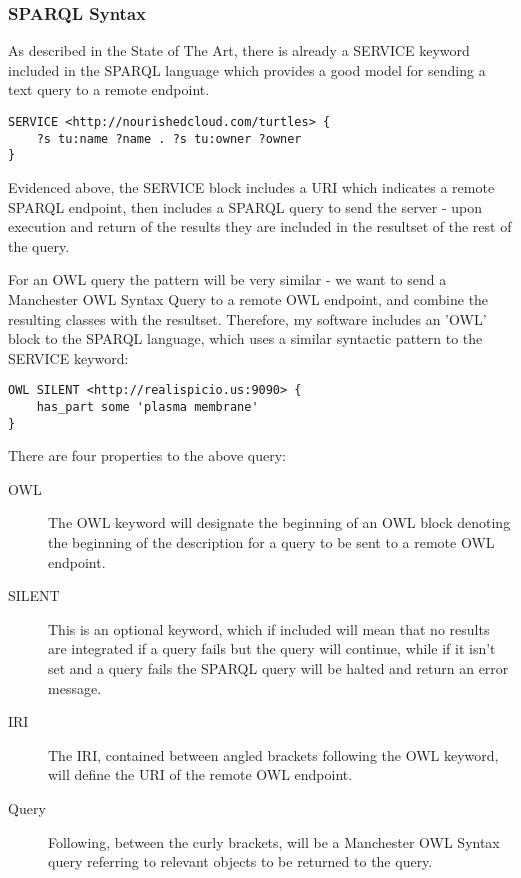 \documentclass{article}
\begin{document}
\subsubsection{SPARQL Syntax}

As described in the State of The Art, there is already a SERVICE keyword
included in the SPARQL language which provides a good model for sending a text
query to a remote endpoint. 

\begin{lstlisting}
SERVICE <http://nourishedcloud.com/turtles> { 
    ?s tu:name ?name . ?s tu:owner ?owner
}
\end{lstlisting}

Evidenced above, the SERVICE block includes a URI which indicates a remote
SPARQL endpoint, then includes a SPARQL query to send the server - upon
execution and return of the results they are included in the resultset of the
rest of the query.

For an OWL query the pattern will be very similar - we want to send a Manchester
OWL Syntax Query to a remote OWL endpoint, and combine the resulting classes
with the resultset. Therefore, my software includes an 'OWL' block to the SPARQL 
language, which uses a similar syntactic pattern to the SERVICE keyword:

\begin{lstlisting}
OWL SILENT <http://realispicio.us:9090> {
    has_part some 'plasma membrane'
}
\end{lstlisting}

There are four properties to the above query:

\begin{description}
    \item[OWL] The OWL keyword will designate the beginning of an OWL block
    denoting the beginning of the description for a query to be sent to a remote
    OWL endpoint.
    \item[SILENT] This is an optional keyword, which if included will mean that
    no results are integrated if a query fails but the query will continue,
    while if it isn't set and a query fails the SPARQL query will be halted and
    return an error message.
    \item[IRI] The IRI, contained between angled brackets following the OWL
    keyword, will define the URI of the remote OWL endpoint.
    \item[Query] Following, between the curly brackets, will be a Manchester OWL
    Syntax query referring to relevant objects to be returned to the query.
\end{description}
\end{document}
